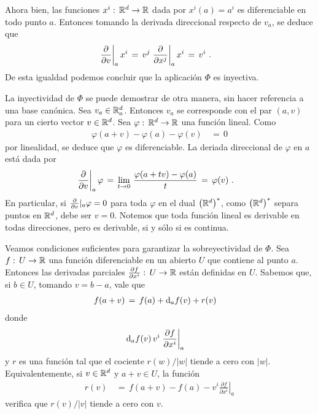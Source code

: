 Ahora bien, las funciones $x^{i}:\,\mathbb{R}^{d}\rightarrow\mathbb{R}$ dada por
$x^{i}(a)=a^{i}$ es diferenciable en todo punto $a$. Entonces tomando
la derivada direccional respecto de $v_{a}$, se deduce que
\begin{align*}
	\left.\gancho{v}\right|_{a}x^{i} & \,=\,
		v^{j}\left.\gancho{x^{j}}\right|_{a}x^{i} \,=\, v^{i}
	\text{ .}
\end{align*}
%
De esta igualdad podemos concluir que la aplicaci\'{o}n $\Phi$ es inyectiva.

La inyectividad de $\Phi$ se puede demostrar de otra manera, sin hacer
referencia a una base can\'{o}nica. Sea $v_{a}\in\mathbb{R}^{d}_{a}$. Entonces
$v_{a}$ se corresponde con el par $(a,v)$ para un cierto vector
$v\in\mathbb{R}^{d}$. Sea $\varphi:\,\mathbb{R}^{d}\rightarrow\mathbb{R}$ una funci\'{o}n
lineal. Como
\begin{align*}
	\varphi(a+v) -\varphi(a)-\varphi(v) & \,=\,0
\end{align*}
%
por linealidad, se deduce que $\varphi$ es diferenciable. La deriada
direccional de $\varphi$ en $a$ est\'{a} dada por
\begin{align*}
	\left.\gancho{v}\right|_{a}\varphi & \,=\,
		\lim_{t\to 0}\,\frac{\varphi(a+tv)-\varphi(a)}{t} \,=\,
		\varphi(v)
	\text{ .}
\end{align*}
%
En particular, si $\gancho{v}|_{a}\varphi=0$ para toda
$\varphi$ en el dual $\left(\mathbb{R}^{d}\right)^{*}$, como $\left(\mathbb{R}^{d}\right)^{*}$ separa
puntos en $\mathbb{R}^{d}$, debe ser $v=0$. Notemos que toda funci\'{o}n lineal
es derivable en todas direcciones, pero es derivable, si y s\'{o}lo si
es continua.

Veamos condiciones suficientes para garantizar la sobreyectividad de $\Phi$.
Sea $f:\,U\rightarrow\mathbb{R}$ una funci\'{o}n diferenciable en un abierto
$U$ que contiene al punto $a$. Entonces las derivadas parciales
$\frac{\partial f}{\partial x^{i}}:\,U\rightarrow\mathbb{R}$ est\'{a}n definidas
en $U$. Sabemos que, si $b\in U$, tomando $v=b-a$, vale que
\begin{align*}
	f(a+v) & \,=\,f(a)+\diferencial[a]{f}(v)+r(v)
\end{align*}
%
donde
\begin{align*}
	\diferencial[a]{f}(v) & \,v^{i}\left.
		\frac{\partial f}{\partial x^{i}}\right|_{a}
\end{align*}
%
y $r$ es una funci\'{o}n tal que el cociente $r(w)/|w|$ tiende a cero con
$|w|$. Equivalentemente, si $v\in\mathbb{R}^{d}$ y $a+v\in U$, la funci\'{o}n
\begin{align*}
	r(v) & \,=\,f(a+v)-f(a)-v^{i}
		\left.\frac{\partial f}{\partial x^{i}}\right|_{a}
\end{align*}
%
verifica que $r(v)/|v|$ tiende a cero con $v$.

